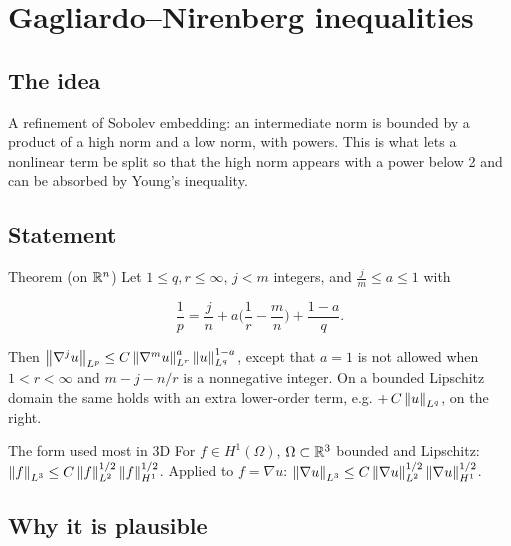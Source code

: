 
\section{Gagliardo--Nirenberg inequalities}\label{p:gagliardo-nirenberg}


\subsection*{The idea}

A refinement of Sobolev embedding: an intermediate norm is bounded by a product of a high norm and a low norm, with powers. This is what lets a nonlinear term be split so that the high norm appears with a power below 2 and can be absorbed by Young's inequality.

\subsection*{Statement}

\begin{thmbox}{Theorem (on $\mathbb{R}^n$)}
%
Let $1\le q, r\le\infty$, $j < m$ integers, and $\frac{j}{m}\le a\le 1$ with

\[ \frac1p = \frac jn + a\Big(\frac1r - \frac mn\Big) + \frac{1-a}{q}. \]

Then $\left\lVert \nabla^j u\right\rVert_{L^p}\le C\left\lVert \nabla^m u\right\rVert_{L^r}^{a}\left\lVert u\right\rVert_{L^q}^{1-a}$, except that $a = 1$ is not allowed when $1< r< \infty$ and $m - j - n/r$ is a nonnegative integer. On a bounded Lipschitz domain the same holds with an extra lower-order term, e.g. $+\,C\left\lVert u\right\rVert_{L^q}$, on the right.
\end{thmbox}

\begin{exbox}{The form used most in 3D}
For $f\in H^1(\Omega)$, $\Omega\subset\mathbb{R}^3$ bounded and Lipschitz: $\left\lVert f\right\rVert_{L^3}\le C\left\lVert f\right\rVert_{L^2}^{1/2}\left\lVert f\right\rVert_{H^1}^{1/2}$. Applied to $f=\nabla u$: $\left\lVert \nabla u\right\rVert_{L^3}\le C\left\lVert \nabla u\right\rVert_{L^2}^{1/2}\left\lVert \nabla u\right\rVert_{H^1}^{1/2}$.
\end{exbox}

\subsection*{Why it is plausible}

